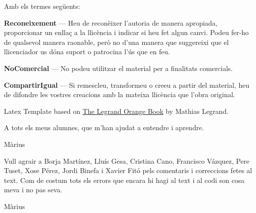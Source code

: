 \noindent Amb els termes següents:
\begin{description}[leftmargin=\parindent]
 \item {\bf Reconeixement} — Heu de reconèixer l'autoria de manera apropiada, proporcionar un enllaç a la llicència i indicar si heu fet algun canvi. Podeu fer-ho de qualsevol manera raonable, però no d'una manera que suggereixi que el llicenciador us dóna suport o patrocina l'ús que en feu.
 \item {\bf NoComercial} — No podeu utilitzar el material per a finalitats comercials.
 \item {\bf CompartirIgual} — Si remescleu, transformeu o creeu a partir del material, heu de difondre les vostres creacions amb la mateixa llicència que l'obra original.
\end{description}

\noindent Latex Template based on \href{https://www.latextemplates.com/template/the-legrand-orange-book}{The Legrand Orange Book} by Mathias Legrand.


\begin{dedication}
 A tots els meus alumnes, que m'han ajudat a entendre i aprendre.
 \par   %
    \vspace{\baselineskip}
    Màrius

    \vspace{4\baselineskip}
    \vspace{4\baselineskip}
    Vull agrair a Borja Martínez, Lluís Gesa, Cristina Cano, Francisco Vázquez, Pere Tuset, Xose Pérez, Jordi Binefa i Xavier Fitó pels comentaris i correccions fetes al text. Com de costum tots els errors que encara hi hagi al text i al codi son cosa meva i no pas seva.
    
    \vspace{\baselineskip}
    Màrius
\end{dedication}



